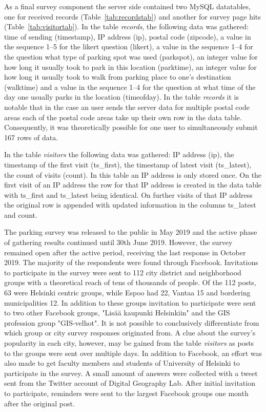 As a final survey component the server side contained two MySQL datatables, one for received records (Table~\ref{tab:recordstab}) and another for survey page hits (Table~\ref{tab:visitortab}). In the table \textit{records}, the following data was gathered: time of sending (timestamp), IP address (ip), postal code (zipcode), a value in the sequence 1--5 for the likert question (likert), a value in the sequence 1--4 for the question what type of parking spot was used (parkspot), an integer value for how long it usually took to park in this location (parktime), an integer value for how long it usually took to walk from parking place to one's destination (walktime) and a value in the sequence 1--4 for the question at what time of the day one usually parks in the location (timeofday). In the table \textit{records} it is notable that in the case an user sends the server data for multiple postal code areas each of the postal code areas take up their own row in the data table. Consequently, it was theoretically possible for one user to simultaneously submit 167 rows of data.

In the table \textit{visitors} the following data was gathered: IP address (ip), the timestamp of the first visit (ts\_first), the timestamp of latest visit (ts\_latest), the count of visits (count). In this table an IP address is only stored once. On the first visit of an IP address the row for that IP address is created in the data table with ts\_first and ts\_latest being identical. On further visits of that IP address the original row is appended with updated information in the columns ts\_latest and count.

The parking survey was released to the public in May 2019 and the active phase of gathering results continued until 30th June 2019. However, the survey remained open after the active period, receiving the last response in October 2019. The majority of the respondents were found through Facebook. Invitations to participate in the survey were sent to 112 city district and neighborhood groups with a theoretical reach of tens of thousands of people. Of the 112 posts, 63 were Helsinki centric groups, while Espoo had 22, Vantaa 15 and bordering municipalities 12. In addition to these groups invitation to participate were sent to two other Facebook groups, "Lisää kaupunki Helsinkiin" and the GIS profession group "GIS-velhot". It is not possible to conclusively differentiate from which group or city survey responses originated from. A clue about the survey's popularity in each city, however, may be gained from the table \textit{visitors} as posts to the groups were sent over multiple days. In addition to Facebook, an effort was also made to get faculty members and students of University of Helsinki to participate in the survey. A small amount of answers were collected with a tweet sent from the Twitter account of Digital Geography Lab. After initial invitation to participate, reminders were sent to the largest Facebook groups one month after the original post.

